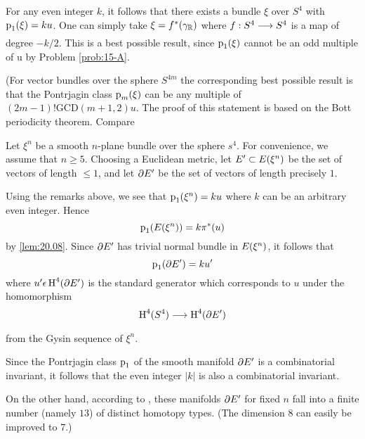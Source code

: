 \documentclass[../main]{subfiles}
\begin{document}
For any even integer $k$, it follows that there exists a bundle $\xi$ over $S^{4}$ with $\operatorname{p}_{1}(\xi)=ku$. One can simply take $\xi=f^{*}(\gamma_{\mathbb{R}})$ where $f: S^{4} \varrightarrow{} S^{4}$ is a map of degree $-k / 2$. This is a best possible result, since $\operatorname{p}_{1}(\xi)$ cannot be an odd multiple of u by Problem \ref{prob:15-A}.

(For vector bundles over the sphere $S^{4 m}$ the corresponding best possible result is that the Pontrjagin class $\operatorname{p}_{m}(\xi)$ can be any multiple of \newline $(2m-1)!\mathrm{GCD}(m+1,2) u$. The proof of this statement is based on the Bott periodicity theorem. Compare \cite{bott1970}
\setcounter{example}{0}

\begin{example}
Let $\xi^{n}$ be a smooth $n$-plane bundle over the sphere $s^{4}$. For convenience, we assume that $n \geq 5$. Choosing a Euclidean metric, let $E^{\prime} \subset E(\xi^{n})$ be the set of vectors of length $\leq 1$, and let $\partial E^{\prime}$ be the set of vectors of length precisely $1 .$
\end{example} 

Using the remarks above, we see that $\operatorname{p}_{1}(\xi^{n})=ku$ where $k$ can be an arbitrary even integer. Hence
\[
\operatorname{p}_{1}(E(\xi^{n}))=k \pi^{*}(u)
\]
by \ref{lem:20.08}. Since $\partial E^{\prime}$ has trivial normal bundle in $E(\xi^{n})$, it follows that
\[
\operatorname{p}_{1}(\partial E^{\prime})=ku^{\prime}
\]
where $u^{\prime} \epsilon \operatorname{H}^{4}(\partial E^{\prime})$ is the standard generator which corresponds to $u$ under the homomorphism
\[
\homology^{4}(S^{4}) \varrightarrow{} \homology^{4}(\partial \total^{\prime})
\]
from the Gysin sequence of $\xi^{n}$.

Since the Pontrjagin class $\operatorname{p}_{1}$ of the smooth manifold $\partial E^{\prime}$ is a combinatorial invariant, it follows that the even integer $|k|$ is also a combinatorial invariant. 

On the other hand, according to \cite{james1954}, these manifolds $\partial E^{\prime}$ for fixed $n$ fall into a finite number (namely $13$) of distinct homotopy types.  (The dimension $8$ can easily be improved to $7$.)
\end{document}
